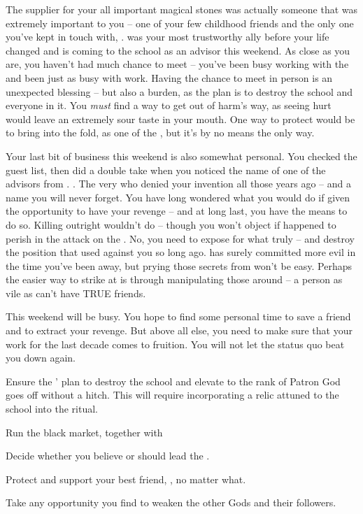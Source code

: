 \documentclass[char]{GL2020}
\begin{document}
The supplier for your all important magical stones was actually someone that was extremely important to you -- one of your few childhood friends and the only one you’ve kept in touch with, \cHeadScientist{}. \cHeadScientist{} was your most trustworthy ally before your life changed and is coming to the school as an advisor this weekend. As close as you are, you haven’t had much chance to meet -- you’ve been busy working with the \pGoaties{} and \cHeadScientist{\they} \cHeadScientist{\have} been just as busy with work. Having the chance to meet in person is an unexpected blessing -- but also a burden, as the plan is to destroy the school and everyone in it. You \emph{must} find a way to get \cHeadScientist{} out of harm’s way, as seeing \cHeadScientist{\them} hurt would leave an extremely sour taste in your mouth. One way to protect \cHeadScientist{\them} would be to bring \cHeadScientist{\them} into the fold, as one of the \pGoaties{}, but it’s by no means the only way.

Your last bit of business this weekend is also somewhat personal. You checked the guest list, then did a double take when you noticed the name of one of the advisors from \pTech{}. \cAntiChup{}. The very \cAntiChup{\cleric} who denied your invention all those years ago -- and a name you will never forget. You have long wondered what you would do if given the opportunity to have your revenge -- and at long last, you have the means to do so. Killing \cAntiChup{} outright wouldn’t do -- though you won’t object if \cAntiChup{\they} happened to perish in the attack on the \pSc{}. No, you need to expose \cAntiChup{\them} for what \cAntiChup{\they} truly \cAntiChup{\are} -- and destroy the position that \cAntiChup{\they} used against you so long ago. \cAntiChup{} has surely committed more evil in the time you’ve been away, but prying those secrets from \cAntiChup{\them} won’t be easy. Perhaps the easier way to strike at \cAntiChup{\them} is through manipulating those around \cAntiChup{\them} -- a person as vile as \cAntiChup{} can’t have TRUE friends.

This weekend will be busy. You hope to find some personal time to save a friend and to extract your revenge. But above all else, you need to make sure that your work for the last decade comes to fruition. You will not let the status quo beat you down again. 

\begin{itemz}[Goals]
	\item Ensure the \pGoaties{}’ plan to destroy the school and elevate \cGenesis{} to the rank of Patron God goes off without a hitch. This will require incorporating a relic attuned to the school into the ritual.
	\item Run the black market, together with \cChupSecond{}
	\item Decide whether you believe \cChupLeader{} or \cChupSecond{} should lead the \pGoaties{}.
	\item Protect and support your best friend, \cHeadScientist{}, no matter what.
	\item Take any opportunity you find to weaken the other Gods and their followers.
\end{itemz}
\end{document}
